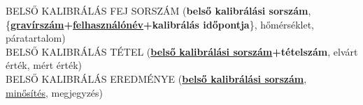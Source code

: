 \documentclass[a4paper,12pt]{report}
\newcommand{\pk}[1]{\textbf{#1}} %
\newcommand{\fk}[1]{\underline{#1}} %
\newcommand{\tabla}[1]{\noindent\MakeUppercase{#1}} %
\begin{document}
\tabla{belső kalibrálás fej sorszám} (\pk{belső kalibrálási sorszám},\\ \{\pk{\fk{gravírszám}+\fk{felhasználónév}+kalibrálás időpontja}\}, hőmérséklet, 
páratartalom)\\

\tabla{belső kalibrálás tétel} (\pk{\fk{belső kalibrálási sorszám}+tételszám}, elvárt érték,
mért érték)\\

\tabla{belső kalibrálás eredménye} (\pk{\fk{belső kalibrálási sorszám}},\\ \fk{minősítés},
megjegyzés)\\







%



%

%
% 
\end{document}
